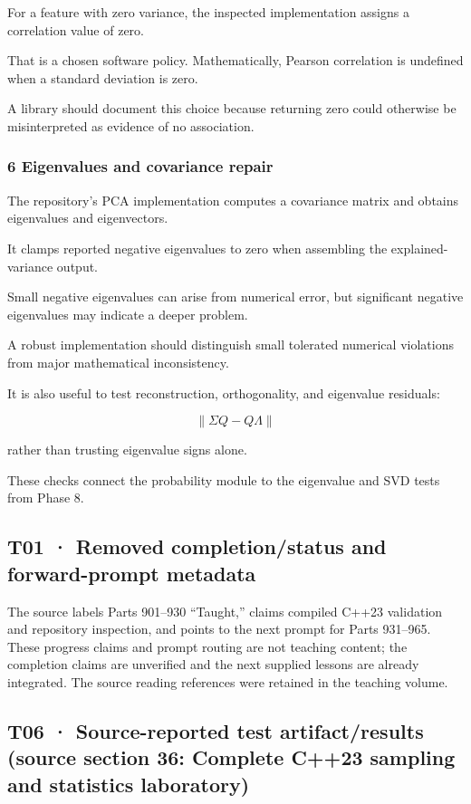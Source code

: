 For a feature with zero variance, the inspected implementation assigns a correlation value of zero.

That is a chosen software policy. Mathematically, Pearson correlation is undefined when a standard deviation is zero.

A library should document this choice because returning zero could otherwise be misinterpreted as evidence of no association.

\subsubsection{6 Eigenvalues and covariance repair}\label{02-foundations-ii-ch039-eigenvalues-and-covariance-repair}

The repository's PCA implementation computes a covariance matrix and obtains eigenvalues and eigenvectors.

It clamps reported negative eigenvalues to zero when assembling the explained-variance output.

Small negative eigenvalues can arise from numerical error, but significant negative eigenvalues may indicate a deeper problem.

A robust implementation should distinguish small tolerated numerical violations from major mathematical inconsistency.

It is also useful to test reconstruction, orthogonality, and eigenvalue residuals:

\[
 \|\Sigma Q-Q\Lambda\|
\]

rather than trusting eigenvalue signs alone.

These checks connect the probability module to the eigenvalue and SVD tests from Phase 8.

\subsection{T01 · Removed completion/status and forward-prompt metadata}\label{02-foundations-ii-ch039-t01-removed-completionstatus-and-forward-prompt-metadata}

The source labels Parts 901--930 ``Taught,'' claims compiled C++23 validation and repository inspection, and points to the next prompt for Parts 931--965. These progress claims and prompt routing are not teaching content; the completion claims are unverified and the next supplied lessons are already integrated. The source reading references were retained in the teaching volume.

\subsection{T06 · Source-reported test artifact/results (source section 36: Complete C++23 sampling and statistics laboratory)}\label{02-foundations-ii-ch039-t06-source-reported-test-artifactresults-source-section-36-complete-c23-sampling-and-statistics-laboratory}

